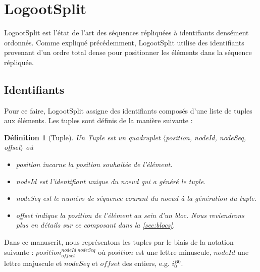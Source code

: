 \documentclass[12pt]{thesul}
\newtheorem{definition}{Définition}
\newcommand{\eg}{e.g. }
\newcommand{\trm}[1]{\mathit{#1}}
\newcommand{\id}[3]{$\trm{#1}^{\trm{#2}}_{\trm{#3}}$}
\begin{document}


\section{LogootSplit}

\label{sec:logootsplit}

LogootSplit \cite{2013-logootsplit} est l'état de l'art des séquences répliquées à identifiants densément ordonnés.
Comme expliqué précédemment, LogootSplit utilise des identifiants provenant d'un ordre total dense pour positionner les éléments dans la séquence répliquée.

\subsection{Identifiants}

Pour ce faire, LogootSplit assigne des identifiants composés d'une liste de tuples aux éléments.
Les tuples sont définis de la manière suivante :

\begin{definition}[Tuple]
  Un \emph{Tuple} est un quadruplet $\langle$position, nodeId, nodeSeq, offset$\rangle$ où
  \begin{itemize}
    \item position incarne la position souhaitée de l'élément.
    \item nodeId est l'identifiant unique du noeud qui a généré le tuple.
    \item nodeSeq est le numéro de séquence courant du noeud à la génération du tuple.
    \item offset indique la position de l'élément au sein d'un bloc. Nous reviendrons plus en détails sur ce composant dans la \autoref{sec:blocs}.
  \end{itemize}
\end{definition}


Dans ce manuscrit, nous représentons les tuples par le biais de la notation suivante : \id{position}{nodeId~nodeSeq}{offset} où $\trm{position}$ est une lettre minuscule, $\trm{nodeId}$ une lettre majuscule et $\trm{nodeSeq}$ et $\trm{offset}$ des entiers, \eg \id{i}{B0}{0}.
\end{document}
